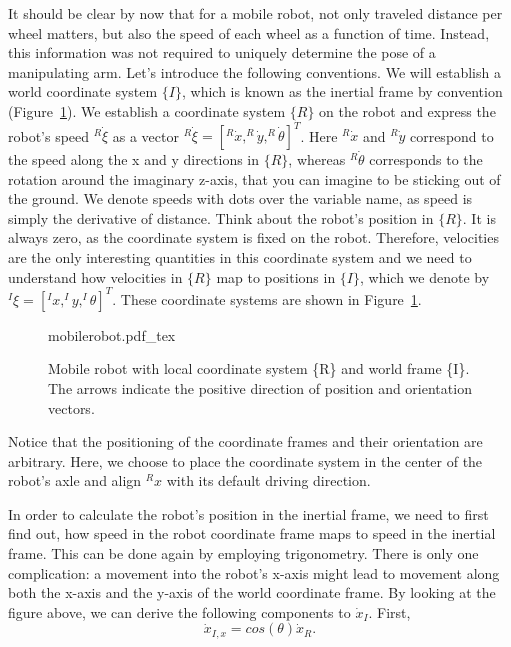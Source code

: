 It should be clear by now that for a mobile robot, not only traveled distance per wheel matters, but also the speed of each wheel as a function of time. Instead, this information was not required to uniquely determine the pose of a manipulating arm. Let's introduce the following conventions. We will establish a world coordinate system $\{I\}$, which is known as the inertial frame by convention (Figure~\ref{fig:mobilerobot}). We establish a coordinate system $\{R\}$ on the robot and express the robot's speed $^R\dot{\xi}$ as a vector $ ^R\dot{\xi}=[^R\dot{x}, ^R\dot{y}, ^R\dot{\theta}]^T$. Here $^R\dot{x}$ and $^R\dot{y}$ correspond to the speed along the x and y directions in $\{R\}$, whereas $^R\dot{\theta}$ corresponds to the rotation around the imaginary z-axis, that you can imagine to be sticking out of the ground. We denote speeds with dots over the variable name, as speed is simply the derivative of distance.  Think about the robot's position in $\{R\}$. It is always zero, as the coordinate system is fixed on the robot. Therefore, velocities are the only interesting quantities in this coordinate system and we need to understand how velocities in $\{R\}$ map to positions in $ \{I\}$, which we denote by $^I\xi=[^Ix, ^Iy, ^I\theta]^T$. These coordinate systems are shown in Figure~\ref{fig:mobilerobot}.

\begin{figure}[htb!]
    \centering
    \def\svgwidth{0.85\textwidth}
    {mobilerobot.pdf_tex}
    \caption{Mobile robot with local coordinate system \{R\} and world frame \{I\}. The arrows indicate the positive direction of position and orientation vectors.}
    \label{fig:mobilerobot}
\end{figure}



Notice that the positioning of the coordinate frames and their orientation are arbitrary. Here, we choose to place the coordinate system in the center of the robot's axle and align $^Rx$ with its default driving direction.

In order to calculate the robot's position in the inertial frame, we need to first find out, how speed in the robot coordinate frame maps to speed in the inertial frame. This can be done again by employing trigonometry. There is only one complication: a movement into the robot's x-axis might lead to movement along both the x-axis and the y-axis of the world coordinate frame. By looking at the figure above, we can derive the following components to $\dot{x}_I$. First,
\begin{equation}
\dot{x}_{I,x}=cos(\theta) \dot{x}_R.
\end{equation}

